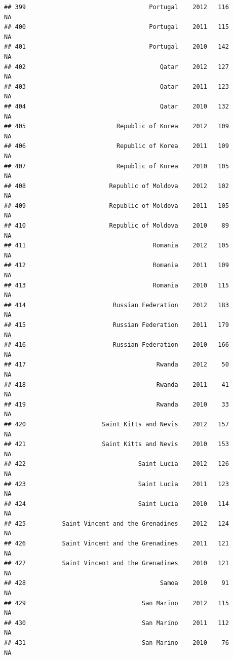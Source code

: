 \documentclass[
]{book}
\begin{document}
\begin{verbatim}
## 399                                  Portugal    2012   116              NA
## 400                                  Portugal    2011   115              NA
## 401                                  Portugal    2010   142              NA
## 402                                     Qatar    2012   127              NA
## 403                                     Qatar    2011   123              NA
## 404                                     Qatar    2010   132              NA
## 405                         Republic of Korea    2012   109              NA
## 406                         Republic of Korea    2011   109              NA
## 407                         Republic of Korea    2010   105              NA
## 408                       Republic of Moldova    2012   102              NA
## 409                       Republic of Moldova    2011   105              NA
## 410                       Republic of Moldova    2010    89              NA
## 411                                   Romania    2012   105              NA
## 412                                   Romania    2011   109              NA
## 413                                   Romania    2010   115              NA
## 414                        Russian Federation    2012   183              NA
## 415                        Russian Federation    2011   179              NA
## 416                        Russian Federation    2010   166              NA
## 417                                    Rwanda    2012    50              NA
## 418                                    Rwanda    2011    41              NA
## 419                                    Rwanda    2010    33              NA
## 420                     Saint Kitts and Nevis    2012   157              NA
## 421                     Saint Kitts and Nevis    2010   153              NA
## 422                               Saint Lucia    2012   126              NA
## 423                               Saint Lucia    2011   123              NA
## 424                               Saint Lucia    2010   114              NA
## 425          Saint Vincent and the Grenadines    2012   124              NA
## 426          Saint Vincent and the Grenadines    2011   121              NA
## 427          Saint Vincent and the Grenadines    2010   121              NA
## 428                                     Samoa    2010    91              NA
## 429                                San Marino    2012   115              NA
## 430                                San Marino    2011   112              NA
## 431                                San Marino    2010    76              NA

\end{verbatim}
\end{document}
